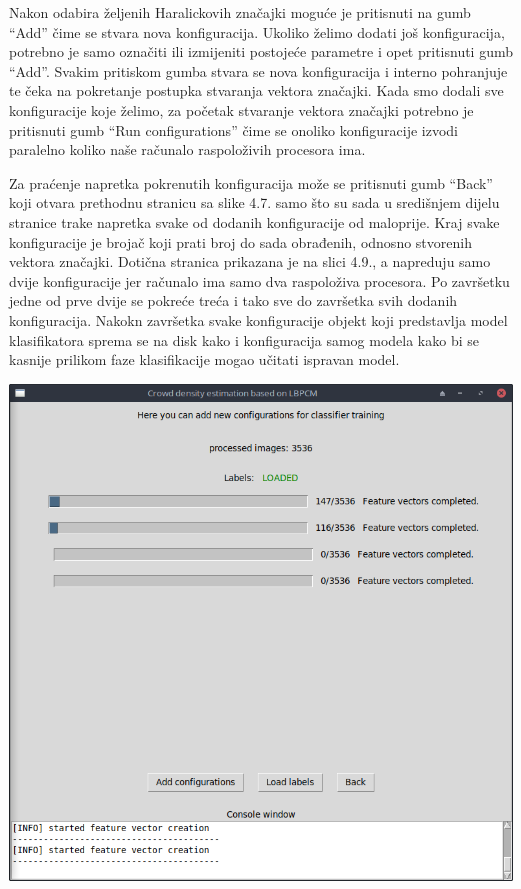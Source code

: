 \documentclass[times, utf8, zavrsni]{fer}
\begin{document}
\bigbreak

Nakon odabira željenih Haralickovih
značajki moguće je pritisnuti na gumb \enquote{Add} čime se stvara
nova konfiguracija. Ukoliko želimo dodati još konfiguracija, potrebno je samo
označiti ili izmijeniti postojeće parametre i opet pritisnuti gumb \enquote{Add}.
Svakim pritiskom gumba stvara se nova konfiguracija i interno pohranjuje te čeka na
pokretanje postupka stvaranja vektora značajki. Kada smo dodali sve konfiguracije
koje želimo, za početak stvaranje vektora značajki potrebno je pritisnuti gumb
\enquote{Run configurations} čime se onoliko konfiguracije izvodi paralelno koliko
naše računalo raspoloživih procesora ima. 

\bigbreak

Za praćenje napretka pokrenutih konfiguracija može se pritisnuti gumb 
\enquote{Back} koji otvara prethodnu stranicu sa slike 4.7. samo što su sada
u središnjem dijelu stranice trake napretka svake od dodanih konfiguracije od maloprije. 
Kraj svake konfiguracije je brojač koji prati broj do sada obrađenih, odnosno
stvorenih vektora značajki. Dotična stranica prikazana je na slici 4.9., a 
napreduju samo dvije konfiguracije jer računalo ima samo dva raspoloživa procesora.
Po završetku jedne od prve dvije se pokreće treća i tako sve do završetka svih 
dodanih konfiguracija. Nakokn završetka svake konfiguracije objekt koji predstavlja 
model klasifikatora sprema se na disk kako i konfiguracija samog modela kako
bi se kasnije prilikom faze klasifikacije mogao učitati ispravan model.

\begin{minipage}{\linewidth}
\centering
\includegraphics[scale=0.4]{img/fvc3.png}
\end{minipage}
\end{document}
